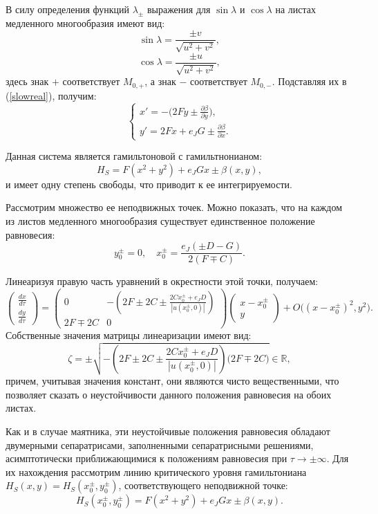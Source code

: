 В силу определения функций $\lambda_{\pm}$ выражения для $\sin \lambda$ и $\cos \lambda$ на листах медленного многообразия имеют вид:
$$\sin \lambda = \frac{\pm v}{\sqrt{u^2+v^2}},$$
$$\cos \lambda = \frac{\pm u}{\sqrt{u^2+v^2}},$$
здесь знак $+$ соответствует $M_{0,+}$, а знак $-$ соответствует $M_{0,-}$.
Подставляя их в (\ref{slowreal}), получим:
\begin{equation}
    \begin{cases}
        x' = - \big( 2Fy \pm \frac{\partial \beta}{\partial y} \big), \\
        y' = 2Fx+e_JG \pm \frac{\partial \beta}{\partial x}.
    \end{cases}
    \label{slow_sys}
\end{equation}

Данная система является гамильтоновой с гамильтнонианом:
$$H_S = F(x^2+y^2) + e_JGx \pm \beta(x,y),$$
и имеет одну степень свободы, что приводит к ее интегрируемости.

Рассмотрим множество ее неподвижных точек. Можно показать, что на каждом из листов медленного многообразия существует единственное положение равновесия:
$$
y_0^{\pm} = 0,\quad
x_0^{\pm} = \frac{e_J (\pm D - G)}{2(F \mp C)}.
$$

Линеаризуя правую часть уравнений в окрестности этой точки, получаем:
$$\begin{pmatrix}
  \frac{dx}{d \tau} \\
  \frac{dy}{d \tau}
 \end{pmatrix}
 =
 \begin{pmatrix}
  0 & -\left( 2F \pm 2C \pm \frac{2Cx_0^{\pm}+e_JD}{|u(x_0^{\pm},0)|} \right) \\
  2F \mp 2C & 0
 \end{pmatrix}
 \begin{pmatrix}
  x - x_0^{\pm}\\
  y
 \end{pmatrix} + O \big( (x-x_0^{\pm})^2, y^2 \big).
 $$
Собственные значения матрицы линеаризации имеют вид:
$$\zeta = \pm \sqrt{- \left( 2F \pm 2C \pm \frac{2Cx_0^{\pm}+e_JD}{|u(x_0^{\pm},0)|} \right)\big( 2F \mp 2C \big)} \in \mathbb{R},$$
причем, учитывая значения констант, они являются чисто вещественными, что позволяет сказать о неустойчивости данного положения равновесия на обоих листах.

Как и в случае маятника, эти неустойчивые положения равновесия обладают двумерными сепаратрисами, заполненными сепаратрисными решениями, асимптотически приближающимися к положениям равновесия при $\tau\to \pm\infty$. Для их нахождения рассмотрим линию критического уровня гамильтониана $H_S(x,y) = H_S(x_0^{\pm},y_0^{\pm})$, соответствующего неподвижной точке:
$$H_S(x_0^{\pm},y_0^{\pm}) = F(x^2+y^2)+e_JGx \pm \beta(x,y).$$

